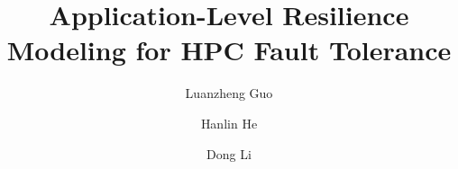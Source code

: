 \documentclass[sigconf]{acmart}
\begin{document}






%

\title{Application-Level Resilience Modeling for HPC Fault Tolerance}
%
\author{Luanzheng Guo}

\author{Hanlin He}

\author{Dong Li}
\end{document}
